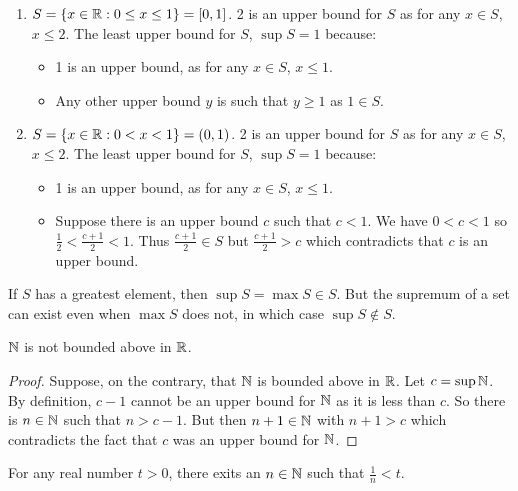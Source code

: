 \documentclass[../main.tex]{subfiles}
\begin{document}
\begin{example}
  \begin{enumerate}
    \item $S = \{x \in \mathbb{R}: 0 \leq x \leq 1\} = [0, 1]$.
      2 is an upper bound for $S$ as for any $x \in S$, $x \leq 2$.
      The least upper bound for $S$, $\sup S = 1$ because:
      \begin{itemize}
        \item 1 is an upper bound, as for any $x \in S$, $x \leq 1$.
        \item Any other upper bound $y$ is such that $y \geq 1$ as $1 \in S$.
      \end{itemize}
    \item $S = \{x \in \mathbb{R}: 0 < x < 1\} = (0, 1)$.
      2 is an upper bound for $S$ as for any $x \in S$, $x \leq 2$.
      The least upper bound for $S$, $\sup S = 1$ because:
      \begin{itemize}
        \item 1 is an upper bound, as for any $x \in S$, $x \leq 1$.
        \item Suppose there is an upper bound $c$ such that $c < 1$.
          We have $0 < c < 1$ so $\frac{1}{2} < \frac{c + 1}{2} < 1$.
          Thus $\frac{c + 1}{2} \in S$ but $\frac{c + 1}{2} > c$ which contradicts that $c$ is an upper bound.
      \end{itemize}
  \end{enumerate}
\end{example}
\begin{remark}[Warning]
  If $S$ has a greatest element, then $\sup S = \max S \in S$.
  But the supremum of a set can exist even when $\max S$ does not, in which case $\sup S \notin S$.
\end{remark}
\begin{proposition}
  $\mathbb{N}$ is not bounded above in $\mathbb{R}$. \label{axiomArchimedes}
\end{proposition}
\begin{proof}
  Suppose, on the contrary, that $\mathbb{N}$ is bounded above in $\mathbb{R}$.
  Let $c = \sup \mathbb{N}$.
  By definition, $c - 1$ cannot be an upper bound for $\mathbb{N}$ as it is less than $c$.
  So there is $n \in \mathbb{N}$ such that $n > c - 1$.
  But then $n + 1 \in \mathbb{N}$ with $n + 1 > c$ which contradicts the fact that $c$ was an upper bound for $\mathbb{N}$.
\end{proof}
\begin{corollary}
  For any real number $t > 0$, there exits an $n \in \mathbb{N}$ such that $\frac{1}{n} < t$. \label{archimedesCorollary}
\end{corollary}
\end{document}
